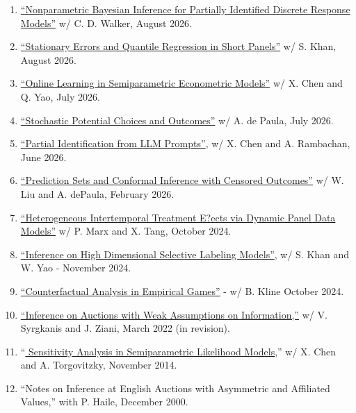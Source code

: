 
\begin{enumerate}[label=\protect\circled{\arabic*}]
\item  \href{https://arxiv.org/abs/2608.25814}{\color{blue}``Nonparametric Bayesian Inference for Partially Identified Discrete Response Models''} w/ C. D. Walker, August 2026.
\item  \href{https://arxiv.org/abs/2608.08750}{\color{blue}``Stationary Errors and Quantile Regression in Short Panels''} w/ S. Khan, August 2026.
	\item  \href{https://arxiv.org/abs/2603.08614}{\color{blue}``Online Learning in Semiparametric Econometric Models''} w/ X. Chen and Q. Yao, July 2026.
\item  \href{https://arxiv.org/abs/2607.21413}{\color{blue}``Stochastic Potential Choices and Outcomes''} w/ A. de Paula, July 2026.
\item  \href{../assets/papers/LLM-June24.pdf}{\color{blue}``Partial Identification from LLM Prompts''}, w/ X. Chen and A. Rambachan, June 2026.
\item  \href{https://arxiv.org/abs/2501.10117}{\color{blue}``Prediction Sets and Conformal Inference with
Censored Outcomes''} w/ W. Liu and A. dePaula, February 2026.
\item  \href{https://arxiv.org/pdf/2410.19060}{\color{blue}``Heterogeneous Intertemporal Treatment E?ects via Dynamic Panel Data Models''} w/ P. Marx and X. Tang, October 2024. 
\item  \href{https://arxiv.org/pdf/2410.18381}{\color{blue} ``Inference on High Dimensional Selective Labeling Models''}, w/ S. Khan and W. Yao - November 2024. 
\item  \href{https://arxiv.org/abs/2410.12731}{\color{blue} ``Counterfactual Analysis in Empirical Games''} - w/ B. Kline October 2024.

	
	\item   \href{https://arxiv.org/pdf/1710.03830.pdf}{\color{blue}``Inference on Auctions with Weak Assumptions on Information,''} w/ V. Syrgkanis and J. Ziani, March 2022 (in revision).
	\item  ``\href{https://cowles.yale.edu/sites/default/files/files/pub/d18/d1836.pdf}{\color{blue} Sensitivity Analysis in Semiparametric Likelihood Models},'' w/ X. Chen and A. Torgovitzky, November 2014. 
	
\item  ``Notes on Inference at English Auctions with Asymmetric and Affiliated Values,'' with P. Haile, December 2000.

\end{enumerate}